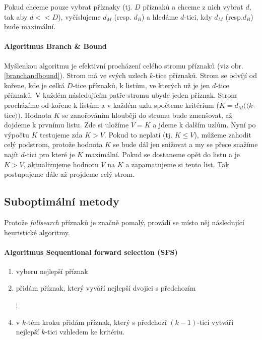 Pokud chceme pouze vybrat příznaky (tj. $D$ příznaků a chceme z nich vybrat $d$, tak aby $d<<D$), vyčíslujeme
$d_M$ (resp. $d_B$) a hledáme $d$-tici, kdy $d_M$ (resp.$d_B$) bude maximální.

\paragraph{Algoritmus Branch \& Bound}
Myšlenkou algoritmu je efektivní procházení celého stromu příznaků (viz obr. \ref{branchandbound}). Strom má ve 
svých uzlech $k$-tice příznaků. Strom se odvíjí od kořene, kde je celká $D$-tice příznaků, k listům, ve kterých už je jen
$d$-tice příznaků. V každém následujícím patře stromu ubyde jeden příznak. Strom procházíme od kořene k listům
a v každém uzlu spočteme kritérium ($K=d_M(\langle k$-tice$\rangle)$. Hodnota $K$ se zanořováním hlouběji do stromu bude zmenšovat, až
dojdeme k prvnímu listu. Zde si uložíme $V=K$ a jdeme k dalším uzlům. Nyní po výpočtu $K$ testujeme zda $K>V$. Pokud
to neplatí (tj. $K\leq V$), můžeme zahodit celý podstrom, protože hodnota $K$ se bude dál jen snižovat a my se 
přece snažíme najít $d$-tici pro které je $K$ maximální. Pokud se dostaneme opět do listu a je $K>V$, 
aktualizujeme hodnotu $V$ na $K$ a zapamatujeme si tento list. Tak postupujeme dále až projdeme celý strom.




\subsection{Suboptimální metody}
Protože \emph{fullsearch} příznaků je značně pomalý, provádí se místo něj následující heuristické algoritmy.

\paragraph{Algoritmus Sequentional forward selection (SFS)}
\begin{enumerate}
	\item vyberu nejlepší příznak
	\item přidám příznak, který vyváří nejlepší dvojici s předchozím
	\item[$\vdots$]
	\item v $k$-tém kroku přidám příznak, který s předchozí $(k-1)$-ticí vytváří nejlepší $k$-tici vzhledem ke kritériu.
\end{enumerate}

